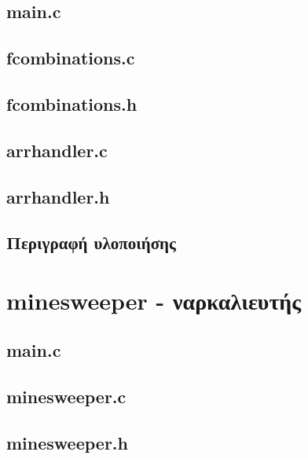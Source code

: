 \documentclass{article}
\begin{document}
    \subsection{main.c}
        

    \subsection{fcombinations.c}
        

    \subsection{fcombinations.h}
        

    \subsection{arrhandler.c}
        

    \subsection{arrhandler.h}
         

    \subsection{Περιγραφή υλοποιήσης}


\section{minesweeper - ναρκαλιευτής}

    \subsection{main.c}
        

    \subsection{minesweeper.c}
        

    \subsection{minesweeper.h}
        
\end{document}
